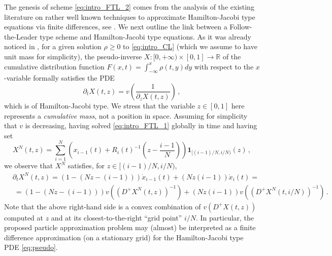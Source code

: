 \documentclass[reqno,oneside]{amsart}
\theoremstyle{plain}
\newcommand{\R}{\mathbb{R}}
\begin{document}
The genesis of scheme \eqref{eq:intro_FTL_2} comes from the analysis of the existing literature on rather well known techniques to approximate Hamilton-Jacobi type equations via finite differences, see \cite{bardi_osher,crandall_lions}. We next outline the link between a Follow-the-Leader type scheme and Hamilton-Jacobi type equations. As it was already noticed in \cite{DR}, for a given solution $\rho\geq 0$ to \eqref{eq:intro_CL} (which we assume to have unit mass for simplicity), the pseudo-inverse $X:[0,+\infty)\times [0,1]\rightarrow \R$ of the cumulative distribution function $F(x,t)=\int_{-\infty}^x \rho(t,y) dy$ with respect to the $x$-variable formally satisfies the PDE
\begin{equation}\label{eq:pseudo}
    \partial_t X(t,z)=v\left(\frac{1}{\partial_z X(t,z)}\right)\,,
\end{equation}
which is of Hamilton-Jacobi type. We stress that the variable $z\in [0,1]$ here represents a \emph{cumulative mass}, not a position in space. Assuming for simplicity that $v$ is decreasing, having solved \eqref{eq:intro_FTL_1} globally in time and having set
\[X^N(t,z)=\sum_{i=1}^N\left(x_{i-1}(t)+R_i(t)^{-1}\left(z-\frac{i-1}{N}\right)\right)\mathbf{1}_{[(i-1)/N,i/N)}(z)\,,\]
we observe that $X^N$ satisfies, for $z\in [(i-1)/N,i/N)$,
\begin{align*}
    & \partial_t X^N(t,z)=\left(1-(Nz-(i-1))\right)\dot{x}_{i-1}(t)+\left(Nz(i-1)\right)\dot{x}_i(t)=\\
    & \ = \left(1-(Nz-(i-1))\right)v\left((D^+ X^N(t,z))^{-1}\right) + \left(Nz(i-1)\right)v\left((D^+ X^N(t,i/N))^{-1}\right)\,.
\end{align*}
Note that the above right-hand side is a convex combination of $v(D^+ X(t,z))$ computed at $z$ and at its closest-to-the-right \enquote{grid point} $i/N$. In particular, the proposed particle approximation problem may (almost) be interpreted as a finite difference approximation (on a stationary grid) for the Hamilton-Jacobi type PDE \eqref{eq:pseudo}. 
\end{document}
